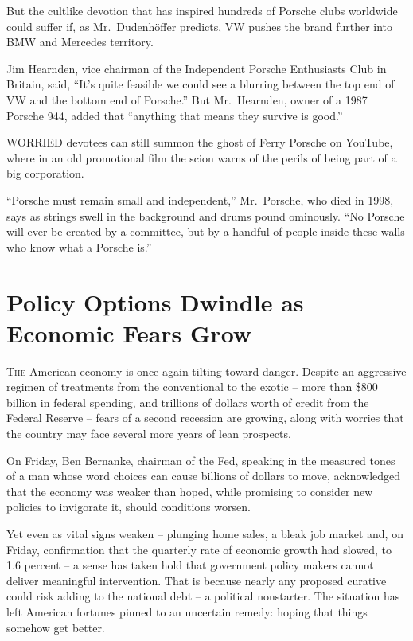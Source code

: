 ﻿\documentclass[12pt]{article}
\begin{document}
But the cultlike devotion that has inspired hundreds of Porsche clubs worldwide could suffer if, as
Mr.~Dudenhöffer predicts, VW pushes the brand further into BMW and Mercedes territory.

Jim Hearnden, vice chairman of the Independent Porsche Enthusiasts Club in Britain, said, ``It's
quite feasible we could see a blurring between the top end of VW and the bottom end of Porsche.''
But Mr.~Hearnden, owner of a 1987 Porsche 944, added that ``anything that means they survive is
good.''

WORRIED devotees can still summon the ghost of Ferry Porsche on YouTube, where in an old promotional
film the scion warns of the perils of being part of a big corporation.

``Porsche must remain small and independent,'' Mr.~Porsche, who died in 1998, says as strings swell
in the background and drums pound ominously. ``No Porsche will ever be created by a committee, but
by a handful of people inside these walls who know what a Porsche is.''

\pagebreak
\section{Policy Options Dwindle as Economic Fears Grow}

\lettrine{T}{he} American economy is once again tilting toward danger.
Despite an aggressive regimen of treatments from the conventional to the exotic -- more than \$800
billion in federal spending, and trillions of dollars worth of credit from the Federal Reserve --
fears of a second recession are growing, along with worries that the country may face several more
years of lean prospects.

On Friday, Ben Bernanke, chairman of the Fed, speaking in the measured tones of a man whose word
choices can cause billions of dollars to move, acknowledged that the economy was weaker than hoped,
while promising to consider new policies to invigorate it, should conditions worsen.

Yet even as vital signs weaken -- plunging home sales, a bleak job market and, on Friday,
confirmation that the quarterly rate of economic growth had slowed, to 1.6 percent -- a sense has
taken hold that government policy makers cannot deliver meaningful intervention. That is because
nearly any proposed curative could risk adding to the national debt -- a political nonstarter. The
situation has left American fortunes pinned to an uncertain remedy: hoping that things somehow get
better.
\end{document}
